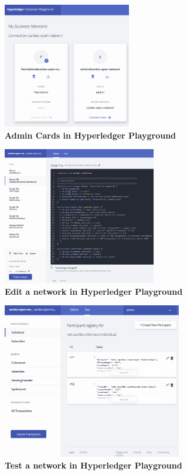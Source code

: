 \begin{figure}[htbp]
  \centering
  \includegraphics[width=0.5\textwidth]{Figures/admin-cards}
  \caption{\bf\small Admin Cards in Hyperledger Playground}
  \label{fig:admin-cards}
\end{figure}

\begin{figure}[htbp]
  \centering
  \includegraphics[width=0.6\textwidth]{Figures/edit-network}
  \caption{\bf\small Edit a network in Hyperledger Playground}
  \label{fig:edit-network}
\end{figure}

\begin{figure}[htbp]
  \centering
  \includegraphics[width=0.7\textwidth]{Figures/test-network}
  \caption{\bf\small Test a network in Hyperledger Playground}
  \label{fig:test-network}
\end{figure}


